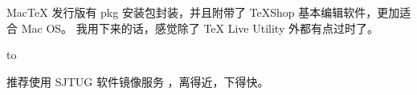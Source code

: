 \begin{shadedsection}
\begin{frame}
{  Mac\TeX{} 发行版有 pkg 安装包封装，并且附带了 \TeX{}Shop 基本编辑软件，更加适合 Mac OS。
  我用下来的话，感觉除了 \TeX{} Live Utility 外都有点过时了。}
\end{frame}

\begin{frame}[plain]
  \hbox to 

  \begin{center}
    \parbox{0.8\textwidth}{
      推荐使用 SJTUG 软件镜像服务 ，离得近，下得快。

}
\end{center}
\end{frame}
\end{shadedsection}
